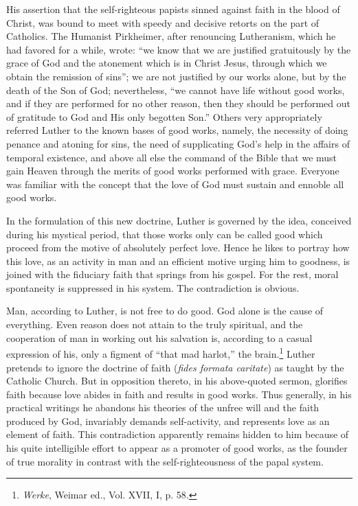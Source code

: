 His assertion that the self-righteous papists sinned against faith in
the blood of Christ, was bound to meet with speedy and decisive retorts
on the part of Catholics. The Humanist Pirkheimer, after renouncing
Lutheranism, which he had favored for a while, wrote: “we know that we
are justified gratuitously by the grace of God and the atonement which is
in Christ Jesus, through which we obtain the remission of sins”; we are
not justified by our works alone, but by the death of the Son of God;
nevertheless, “we cannot have life without good works, and if they are
performed for no other reason, then they should be performed out of gratitude
to God and His only begotten Son.” Others very appropriately referred
Luther to the known bases of good works, namely, the necessity of doing
penance and atoning for sins, the need of supplicating God’s help in the
affairs of temporal existence, and above all else the command of the Bible
that we must gain Heaven through the merits of good works performed
with grace. Everyone was familiar with the concept that the love of God
must sustain and ennoble all good works.

In the formulation of this new doctrine, Luther is governed by the
idea, conceived during his mystical period, that those works only can
be called good which proceed from the motive of absolutely perfect
love. Hence he likes to portray how this love, as an activity in man
and an efficient motive urging him to goodness, is joined with the
fiduciary faith that springs from his gospel. For the rest, moral spontaneity
is suppressed in his system. The contradiction is obvious.

Man, according to Luther, is not free to do good. God alone is the cause
of everything. Even reason does not attain to the truly spiritual, and the
cooperation of man in working out his salvation is, according to a casual expression
of his, only a figment of ``that mad harlot,'' the brain.\footnote
{\textit{Werke}, Weimar ed., Vol. XVII, I, p. 58.}
Luther pretends to ignore the doctrine of faith (\textit{fides formata caritate})
as taught by the Catholic Church. But in opposition thereto, in his above-quoted
sermon, glorifies faith because love abides in faith and results
in good works. Thus generally, in his practical writings he abandons his
theories of the unfree will and the faith produced by God, invariably
demands self-activity, and represents love as an element of faith. This contradiction apparently remains hidden to him because of his quite intelligible
effort to appear as a promoter of good works, as the founder of true morality in contrast with the self-righteousness of the papal system.


